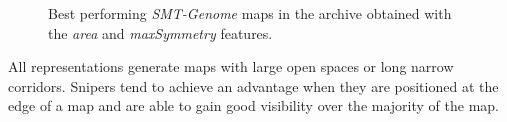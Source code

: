 \begin{figure}[p]
{    }
    \qquad
    \caption{Best performing \textit{SMT-Genome} maps in the archive obtained with the \textit{area} and \textit{maxSymmetry} features.}
    \label{fig:best_maps_smt_exp1}
\end{figure}

All representations generate maps with large open spaces or long narrow corridors. Snipers tend to achieve an advantage when they are positioned at the edge of a map and are able to gain good visibility over the majority of the map.

